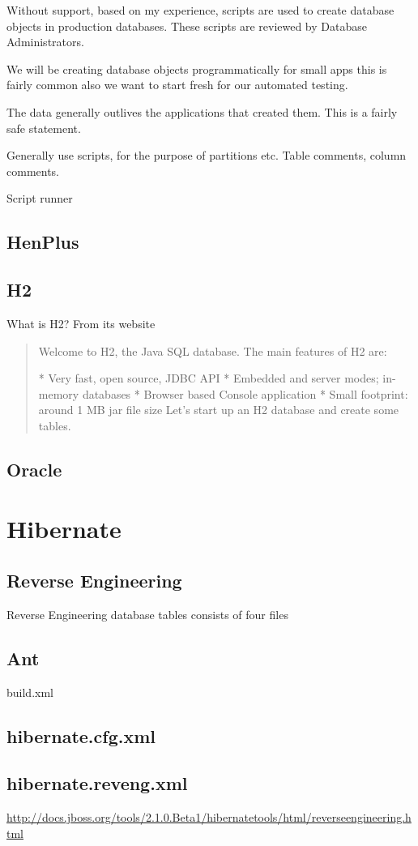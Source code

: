 \documentclass[a4paper,10pt]{book}
\begin{document}
Without support, based on my experience, scripts are used to create database objects in production
databases.  These scripts are reviewed by Database Administrators. 

We will be creating database objects programmatically for small apps this is fairly common also we
want to start fresh for our automated testing.

The data generally outlives the applications that created them. This is a fairly safe statement.

Generally use scripts, for the purpose of partitions etc.  Table comments, column comments.

Script runner
\section{HenPlus}
\section{H2}
What is H2?  From its website
\begin{quotation}
 Welcome to H2, the Java SQL database. The main features of H2 are:

    * Very fast, open source, JDBC API
    * Embedded and server modes; in-memory databases
    * Browser based Console application
    * Small footprint: around 1 MB jar file size 
Let's start up an H2 database and create some tables.
\end{quotation}
\section{Oracle}

\chapter{Hibernate}
\section{Reverse Engineering}
Reverse Engineering database tables consists of four files
\section{Ant}
build.xml
\section{hibernate.cfg.xml}
\section{hibernate.reveng.xml}
\url{http://docs.jboss.org/tools/2.1.0.Beta1/hibernatetools/html/reverseengineering.html}
\end{document}
